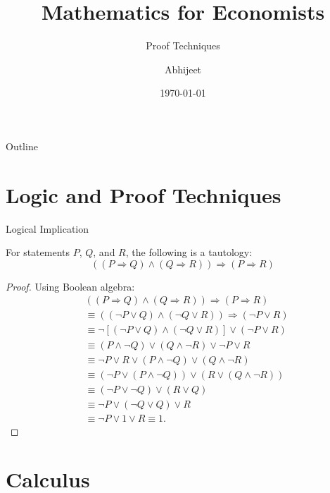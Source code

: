 \documentclass{beamer}
\title{Mathematics for Economists}
\subtitle{Proof Techniques }
\author{Abhijeet}
\institute{IGIDR}
\date{\today}
\begin{document}
\begin{frame}
    \titlepage
\end{frame}

\begin{frame}{Outline}
    \tableofcontents
\end{frame}

\section{Logic and Proof Techniques}

\begin{frame}{Logical Implication}
    \begin{theorem}
        For statements $P$, $Q$, and $R$, the following is a tautology:
        \[
        ((P \Rightarrow Q) \land (Q \Rightarrow R)) \Rightarrow (P \Rightarrow R)
        \]
    \end{theorem}

    \begin{proof}
        Using Boolean algebra:
        \begin{align*}
            &((P \Rightarrow Q) \land (Q \Rightarrow R)) \Rightarrow (P \Rightarrow R) \\
            &\equiv ((\neg P \lor Q) \land (\neg Q \lor R)) \Rightarrow (\neg P \lor R) \\
            &\equiv \neg[(\neg P \lor Q) \land (\neg Q \lor R)] \lor (\neg P \lor R) \\
            &\equiv (P \land \neg Q) \lor (Q \land \neg R) \lor \neg P \lor R \\
            &\equiv \neg P \lor R \lor (P \land \neg Q) \lor (Q \land \neg R) \\
            &\equiv (\neg P \lor (P \land \neg Q)) \lor (R \lor (Q \land \neg R)) \\
            &\equiv (\neg P \lor \neg Q) \lor (R \lor Q) \\
            &\equiv \neg P \lor (\neg Q \lor Q) \lor R \\
            &\equiv \neg P \lor 1 \lor R \equiv 1.
        \end{align*}
    \end{proof}
\end{frame}

\section{Calculus}
\end{document}
